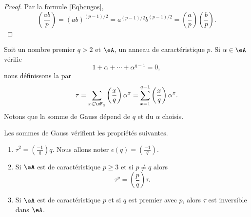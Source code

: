 \begin{proof}
	Par la formule \eqref{Eqbcugos},
	\begin{equation}
		\left(\frac{ab}{p}\right)=(ab)^{(p-1)/2}=a^{(p-1)/2}b^{(p-1)/2}=\left(\frac{a}{p}\right)\left(\frac{b}{p}\right).
	\end{equation}
\end{proof}

Soit un nombre premier \( q>2\) et \( \eA\), un anneau de caractéristique \( p\). Si \( \alpha\in \eA\) vérifie
\begin{equation}
	1+\alpha+\cdots+\alpha^{q-1}=0,
\end{equation}
nous définissons la  par
\begin{equation}
	\tau=\sum_{x\in \eF_q}\left(\frac{x}{q}\right)\alpha^x=\sum_{x=1}^{q-1}\left(\frac{x}{q}\right)\alpha^x.
\end{equation}
Notons que la somme de Gauss dépend de \( q\) et du \( \alpha\) choisis.

\begin{proposition} \label{PropciRUov}
	Les sommes de Gauss vérifient les propriétés suivantes.
	\begin{enumerate}
		\item
		      \( \tau^2=\left(\frac{-1}{q}\right)q\). Nous allons noter \( \epsilon(q)=\left(\frac{-1}{q}\right)\).
		\item
		      Si \( \eA\) est de caractéristique \( p\geq 3\) et si \( p\neq q\) alors
		      \begin{equation}    \label{EqxBNpJz}
			      \tau^p=\left(\frac{p}{q}\right)\tau.
		      \end{equation}
		\item
		      Si \( \eA\) est de caractéristique \( p\) et si \( q\) est premier avec \( p\), alors \( \tau\) est inversible dans \( \eA\).
	\end{enumerate}
\end{proposition}

